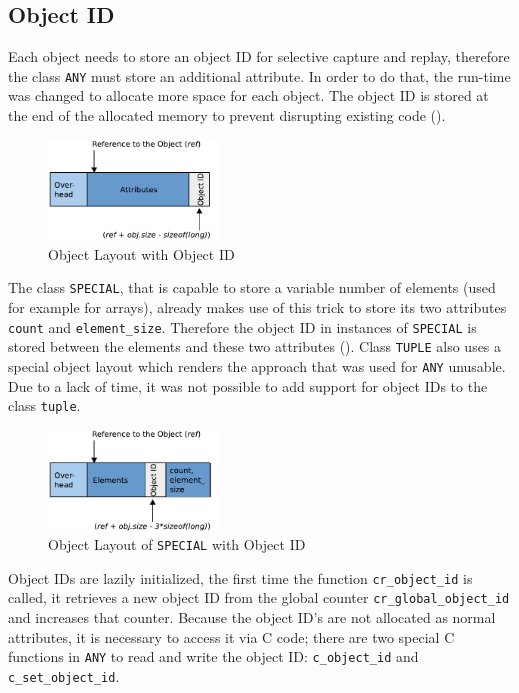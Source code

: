 \subsection{Object ID}
Each object needs to store an object ID for selective capture and replay, therefore the class \texttt{ANY} must store an additional attribute. In order to do that, the run-time was  changed to allocate more space for each object. The object ID is stored at the end of the allocated memory to prevent disrupting existing code ().
\begin{figure}[ht]
  \centering
  \includegraphics[width=0.4\textwidth]{illustrations/any_object_id}
  \caption{Object Layout with Object ID}
  \label{fig:any_object_id}
\end{figure}

The class \texttt{SPECIAL}, that is capable to store a variable number of elements (used for example for arrays), already makes use of this trick to store its two attributes \texttt{count} and \texttt{element\_size}. Therefore the object ID in instances of \texttt{SPECIAL} is stored between the elements and these two attributes (). Class \texttt{TUPLE} also uses a special object layout which renders the approach that was used for \texttt{ANY} unusable. Due to a lack of time, it was not possible to add support for object IDs to the class \texttt{tuple}.
\begin{figure}[ht]
  \centering
  \includegraphics[width=0.4\textwidth]{illustrations/special_object_id}
  \caption{Object Layout of \texttt{SPECIAL} with Object ID}
  \label{fig:special_object_id}
\end{figure}

Object IDs are lazily initialized, the first time the function \texttt{cr\_object\_id} is called, it retrieves a new object ID from the global counter \texttt{cr\_global\_object\_id} and increases that counter. Because the object ID's are not allocated as normal attributes, it is necessary to access it via C code; there are two special C functions in \texttt{ANY} to read and write the object ID: \texttt{c\_object\_id} and \texttt{c\_set\_object\_id}.


